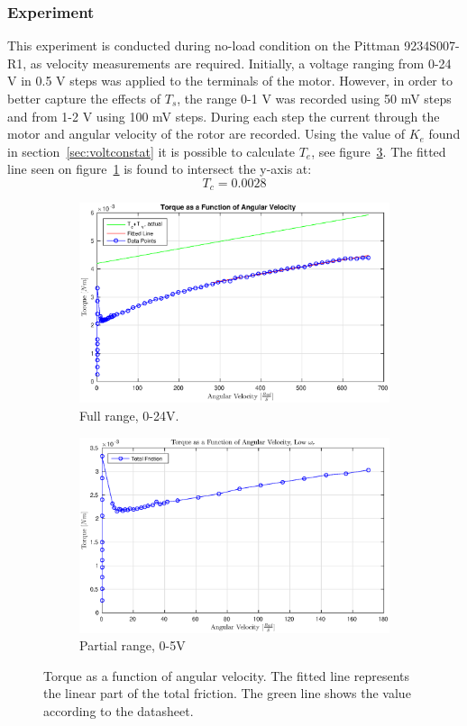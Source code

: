 \subsubsection{Experiment}
This experiment is conducted during no-load condition on the Pittman 9234S007-R1, as velocity measurements are required.
Initially, a voltage ranging from 0-24 V in 0.5 V steps was applied to the terminals of the motor. However, in order to better capture the effects of $T_s$, the range 0-1 V was recorded using 50 mV steps and from 1-2 V using 100 mV steps.
During each step the current through the motor and angular velocity of the rotor are recorded.
Using the value of $K_e$ found in section~\ref{sec:voltconstat} it is possible to calculate $T_e$, see figure~\ref{fig:tqangle}. The fitted line seen on figure~\ref{fig:tqanglefull} is found to intersect the y-axis at:
$$T_c=0.0028$$
\begin{figure}[!h]
	\begin{subfigure}[t]{.49\linewidth}
		\centering
		\includegraphics[width=\textwidth]{graphics/tevel}
		\caption{Full range, 0-24V.}
		\label{fig:tqanglefull}
	\end{subfigure}
	\begin{subfigure}[t]{.49\linewidth}
		\includegraphics[width=\textwidth]{graphics/tevel_low}
		\caption{Partial range, 0-5V}
		\label{fig:tqanglelow}
	\end{subfigure}
	\caption[Torque as a function of angular velocity]{Torque as a function of angular velocity. The fitted line represents the linear part of the total friction. The green line shows the value according to the datasheet.}
	\label{fig:tqangle}
\end{figure}

